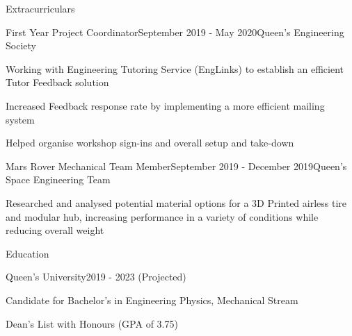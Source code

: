 \documentclass{resume} %
\begin{document}
\begin{rSection}{Extracurriculars}
\begin{rSubsection}{First Year Project Coordinator}{September 2019 - May 2020}{Queen's Engineering Society}{}
\item Working with Engineering Tutoring Service (EngLinks) to establish an efficient Tutor Feedback solution
\item Increased Feedback response rate by implementing a more efficient mailing system
\item Helped organise workshop sign-ins and overall setup and take-down

\end{rSubsection}


\begin{rSubsection}{Mars Rover Mechanical Team Member}{September 2019 - December 2019}{Queen's Space Engineering Team}{}
\item Researched and analysed potential material options for a 3D Printed airless tire and modular hub, increasing performance in a variety of conditions while reducing overall weight

\end{rSubsection}

\end{rSection}


\begin{rSection}{Education}

\begin{rSubsection}{Queen's University}{2019 - 2023 (Projected)}{}{}
\item Candidate for Bachelor's in Engineering Physics, Mechanical Stream
\item Dean's List with Honours (GPA of 3.75)
\end{rSubsection}
\end{rSection}
\end{document}
